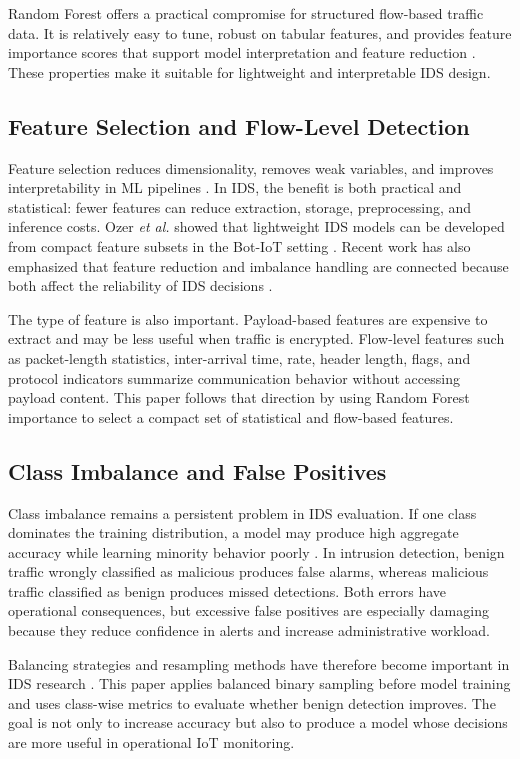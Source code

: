 \documentclass[journal]{IEEEtran}
\begin{document}
Random Forest offers a practical compromise for structured flow-based traffic data. It is relatively easy to tune, robust on tabular features, and provides feature importance scores that support model interpretation and feature reduction \cite{breiman2001random}. These properties make it suitable for lightweight and interpretable IDS design.

\subsection{Feature Selection and Flow-Level Detection}
Feature selection reduces dimensionality, removes weak variables, and improves interpretability in ML pipelines \cite{guyon2003feature}. In IDS, the benefit is both practical and statistical: fewer features can reduce extraction, storage, preprocessing, and inference costs. Ozer \emph{et al.} showed that lightweight IDS models can be developed from compact feature subsets in the Bot-IoT setting \cite{ozer2021lightweight}. Recent work has also emphasized that feature reduction and imbalance handling are connected because both affect the reliability of IDS decisions \cite{musthafa2024balanced,ma2025fsllm}.

The type of feature is also important. Payload-based features are expensive to extract and may be less useful when traffic is encrypted. Flow-level features such as packet-length statistics, inter-arrival time, rate, header length, flags, and protocol indicators summarize communication behavior without accessing payload content. This paper follows that direction by using Random Forest importance to select a compact set of statistical and flow-based features.

\subsection{Class Imbalance and False Positives}
Class imbalance remains a persistent problem in IDS evaluation. If one class dominates the training distribution, a model may produce high aggregate accuracy while learning minority behavior poorly \cite{chawla2002smote,zoghi2021unswimbalance}. In intrusion detection, benign traffic wrongly classified as malicious produces false alarms, whereas malicious traffic classified as benign produces missed detections. Both errors have operational consequences, but excessive false positives are especially damaging because they reduce confidence in alerts and increase administrative workload.

Balancing strategies and resampling methods have therefore become important in IDS research \cite{musthafa2024balanced,shanmugam2025imbalance}. This paper applies balanced binary sampling before model training and uses class-wise metrics to evaluate whether benign detection improves. The goal is not only to increase accuracy but also to produce a model whose decisions are more useful in operational IoT monitoring.
\end{document}
